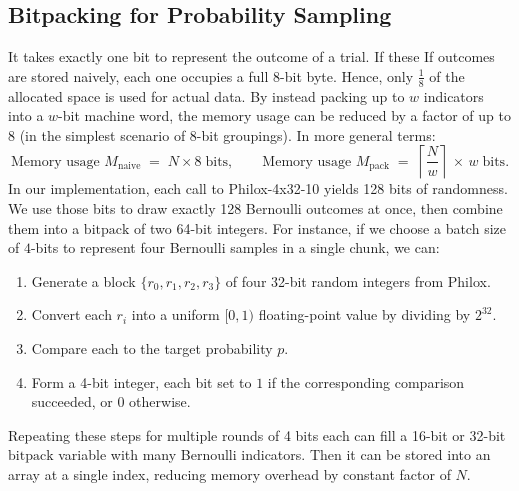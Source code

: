 \subsection{Bitpacking for Probability Sampling}
It takes exactly one bit to represent the outcome of a trial. If these If outcomes are stored naively, each one occupies a full 8-bit byte. Hence, only \( \tfrac{1}{8} \) of the allocated space is used for actual data. By instead packing up to \(w\) indicators into a \(w\)-bit machine word, the memory usage can be reduced by a factor of up to \(8\) (in the simplest scenario of 8-bit groupings). In more general terms:
\[
  \text{Memory usage }M_{\text{naive}}
  \;=\;
  N \times 8\;\text{bits},
  \qquad
  \text{Memory usage }M_{\text{pack}}
  \;=\;
  \left\lceil\frac{N}{w}\right\rceil \,\times\,w\;\text{bits}.
\]
In our implementation, each call to Philox-4x32-10 yields 128 bits of randomness. We use those bits to draw exactly 128 Bernoulli outcomes at once, then combine them into a \(\mathrm{bitpack}\) of two 64-bit integers. For instance, if we choose a batch size of \(4\)-bits to represent four Bernoulli samples in a single chunk, we can:

\begin{enumerate}
    \item Generate a block \(\{r_0, r_1, r_2, r_3\}\) of four 32-bit random integers from Philox.
    \item Convert each \(r_i\) into a uniform \([0,1)\) floating-point value by dividing by \(2^{32}\).
    \item Compare each to the target probability \(p\).
    \item Form a 4-bit integer, each bit set to \(1\) if the corresponding comparison succeeded, or \(0\) otherwise.
\end{enumerate}

\noindent Repeating these steps for multiple rounds of 4 bits each can fill a 16-bit or 32-bit \(\mathrm{bitpack}\) variable with many Bernoulli indicators. Then it can be stored into an array at a single index, reducing memory overhead by constant factor of $N$. 




